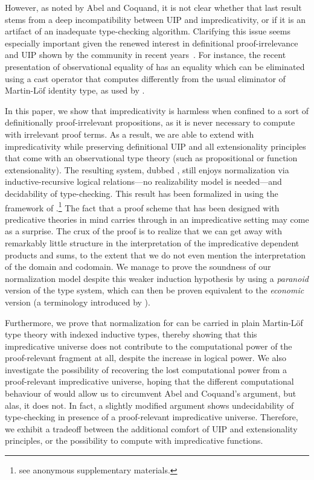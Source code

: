 However, as noted by Abel and Coquand, it is not clear whether that last
result stems from a deep incompatibility between UIP and impredicativity,
or if it is an artifact of an inadequate type-checking algorithm.
%
Clarifying this issue seems especially important given the renewed
interest in definitional proof-irrelevance and UIP shown by the community
in recent years~.
%
For instance, the recent presentation \SetoidTT of observational
equality of  has an equality which can be
eliminated using a cast operator that computes differently from the
usual eliminator of Martin-Löf identity type, as used by .


In this paper, we show that impredicativity is harmless when confined
to a sort of definitionally proof-irrelevant propositions, as it is never
necessary to compute with irrelevant proof terms.
%
As a result, we are able to extend \SetoidTT with impredicativity while
preserving definitional UIP and all extensionality principles that come
with an observational type theory (such as propositional or function
extensionality).
%
The resulting system, dubbed \SetoidCC, still enjoys
normalization via inductive-recursive logical relations---no
realizability model is needed---and decidability of type-checking.
%
This result has been formalized in \Agda using the framework of
.\footnote{see anonymous supplementary
  materials.}
%
The fact that a proof scheme that has been designed with predicative
theories in mind carries through in an impredicative setting
may come as a surprise.
%
The crux of the proof is to realize that we can get away with
remarkably little structure in the interpretation of the impredicative
dependent products and sums, to the extent that we do not even mention the
interpretation of the domain and codomain.
%
We manage to prove the soundness of our normalization model
despite this weaker induction hypothesis by using a \emph{paranoid}
version of the type system, which can then be proven equivalent to the
\emph{economic} version (a terminology introduced by
).

%
Furthermore, we prove that normalization for \SetoidCC can be
carried in plain Martin-Löf type theory with indexed inductive types,
thereby showing that this impredicative universe does not contribute
to the computational power of the proof-relevant fragment at all,
despite the increase in logical power.
%
We also investigate the possibility of recovering the lost computational power
from a proof-relevant impredicative universe, hoping that the different
computational behaviour of \SetoidCC would allow us to circumvent Abel and
Coquand's argument, but alas, it does not. In fact, a slightly modified
argument shows undecidability of type-checking in presence of a
proof-relevant impredicative universe.
%
Therefore, we exhibit a tradeoff between the additional comfort of
UIP and extensionality principles, or the possibility to compute with
impredicative functions.

